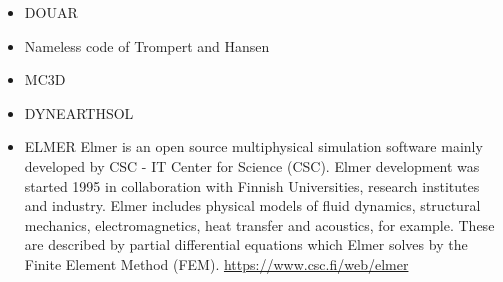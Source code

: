 \begin{itemize}
{\small
\noindent
\cite{yoth12}
\cite{yosh13} 
} 

\item {\codefont DOUAR} 

{\small
\noindent
\cite{brtf08}\cite{thfb08}
\cite{yahb09}
\cite{brya10}\cite{lobh10}
\cite{mutg14}\cite{whbb14}
\cite{neew18}
\cite{koen19}
}

\item Nameless code of Trompert and Hansen

{\small
\cite{trha96}
\cite{trha98}\cite{trha98b}
\cite{goch04}
\cite{losh06}
\cite{loha08}
\cite{stfh10}
\cite{stlh13}
\cite{stha13}
\cite{stha14}
}

\item MC3D 

\cite{stfl11}

\item {\codefont DYNEARTHSOL} 

{\small
\noindent
\cite{chtl13}
\cite{jalr15}
\cite{lolc17}
}

\item {\codefont ELMER} 
Elmer is an open source multiphysical simulation software mainly developed by 
CSC - IT Center for Science (CSC). Elmer development was started 1995 in collaboration with 
Finnish Universities, research institutes and industry. Elmer includes physical models of 
fluid dynamics, structural mechanics, electromagnetics, heat transfer and acoustics, 
for example. These are described by partial differential equations which Elmer solves 
by the Finite Element Method (FEM). \url{https://www.csc.fi/web/elmer}

\cite{mals14}


\end{itemize}
